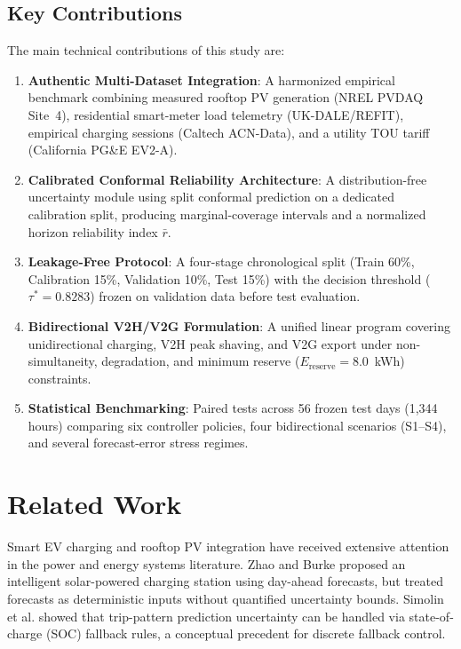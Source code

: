 \documentclass[conference]{IEEEtran}
\begin{document}
\subsection{Key Contributions}
The main technical contributions of this study are:
\begin{enumerate}
    \item \textbf{Authentic Multi-Dataset Integration}: A harmonized empirical benchmark combining measured rooftop PV generation (NREL PVDAQ Site~4), residential smart-meter load telemetry (UK-DALE/REFIT), empirical charging sessions (Caltech ACN-Data), and a utility TOU tariff (California PG\&E EV2-A).
    \item \textbf{Calibrated Conformal Reliability Architecture}: A distribution-free uncertainty module using split conformal prediction on a dedicated calibration split, producing marginal-coverage intervals and a normalized horizon reliability index $\bar{r}$.
    \item \textbf{Leakage-Free Protocol}: A four-stage chronological split (Train 60\%, Calibration 15\%, Validation 10\%, Test 15\%) with the decision threshold ($\tau^* = 0.8283$) frozen on validation data before test evaluation.
    \item \textbf{Bidirectional V2H/V2G Formulation}: A unified linear program covering unidirectional charging, V2H peak shaving, and V2G export under non-simultaneity, degradation, and minimum reserve ($E_{\text{reserve}} = 8.0$~kWh) constraints.
    \item \textbf{Statistical Benchmarking}: Paired tests across 56 frozen test days (1,344 hours) comparing six controller policies, four bidirectional scenarios (S1--S4), and several forecast-error stress regimes.
\end{enumerate}

\section{Related Work}
Smart EV charging and rooftop PV integration have received extensive attention in the power and energy systems literature. Zhao and Burke \cite{zhao2014intelligent} proposed an intelligent solar-powered charging station using day-ahead forecasts, but treated forecasts as deterministic inputs without quantified uncertainty bounds. Simolin et al. \cite{simolin2020assessment} showed that trip-pattern prediction uncertainty can be handled via state-of-charge (SOC) fallback rules, a conceptual precedent for discrete fallback control.
\end{document}
